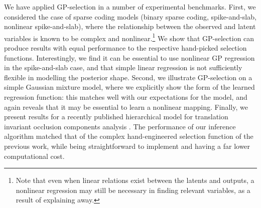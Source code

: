 We have applied GP-selection in a number of experimental benchmarks.
First, we considered the case of sparse coding models (binary sparse coding,
spike-and-slab, nonlinear spike-and-slab), where the relationship between the
observed and latent variables is known to be complex and nonlinear.\footnote{Note that
 even
when linear relations exist between the latents and outputs, a nonlinear
regression may still be necessary in finding relevant variables,
as a result of explaining away.}
We show that GP-selection can produce results with equal performance to the respective  hand-picked selection functions.
Interestingly,
we find it can be essential to use nonlinear GP regression
in the spike-and-slab case, and that simple linear regression is not
sufficiently flexible in modelling the posterior shape.
Second, we illustrate GP-selection on a simple Gaussian mixture
model,
where we explicitly show the form of the learned regression function: this matches
well with our expectations for the model, and again reveals that it may be essential
to learn a nonlinear mapping.
Finally, we present results
for a recently published hierarchical model for  translation invariant occlusion components analysis
\citep{DaiLucke2014}.
The performance of our inference algorithm matched that of the complex
hand-engineered selection function of the previous work, while being straightforward
to implement and having a far lower computational cost.



